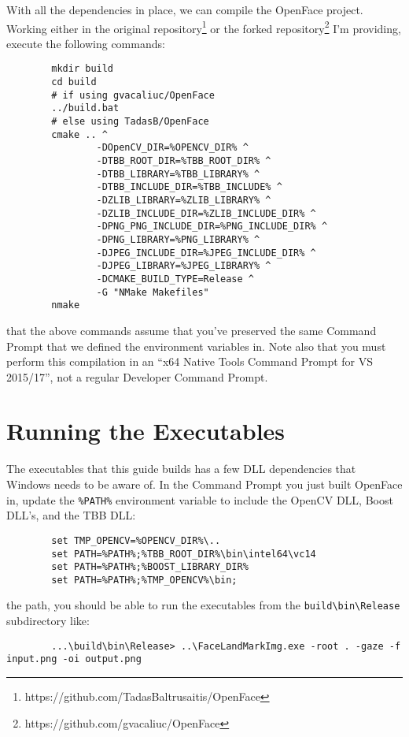 \documentclass{tufte-handout}
\begin{document}
    With all the dependencies in place, we can compile the OpenFace project.  Working
    either in the original repository\footnote{https://github.com/TadasBaltrusaitis/OpenFace} or 
    the forked repository\footnote{https://github.com/gvacaliuc/OpenFace} I'm providing,
    execute the following commands:

    \begin{lstlisting}
        mkdir build
        cd build
        # if using gvacaliuc/OpenFace
        ../build.bat
        # else using TadasB/OpenFace
        cmake .. ^
                -DOpenCV_DIR=%OPENCV_DIR% ^
                -DTBB_ROOT_DIR=%TBB_ROOT_DIR% ^
                -DTBB_LIBRARY=%TBB_LIBRARY% ^
                -DTBB_INCLUDE_DIR=%TBB_INCLUDE% ^
                -DZLIB_LIBRARY=%ZLIB_LIBRARY% ^
                -DZLIB_INCLUDE_DIR=%ZLIB_INCLUDE_DIR% ^
                -DPNG_PNG_INCLUDE_DIR=%PNG_INCLUDE_DIR% ^
                -DPNG_LIBRARY=%PNG_LIBRARY% ^
                -DJPEG_INCLUDE_DIR=%JPEG_INCLUDE_DIR% ^
                -DJPEG_LIBRARY=%JPEG_LIBRARY% ^
                -DCMAKE_BUILD_TYPE=Release ^
                -G "NMake Makefiles"
        nmake
    \end{lstlisting}

     that the above commands assume that you've preserved the same Command
    Prompt that we defined the environment variables in.  Note also that you must perform this
    compilation in an ``x64 Native Tools Command Prompt for VS 2015/17'', not a regular Developer
    Command Prompt.

\section{Running the Executables}

    The executables that this guide builds has a few DLL dependencies that Windows needs to
    be aware of.  In the Command Prompt you just built OpenFace in, update the \Verb|%
    environment variable to include the OpenCV DLL, Boost DLL's, and the TBB DLL:

    \begin{lstlisting}
        set TMP_OPENCV=%OPENCV_DIR%\..
        set PATH=%PATH%;%TBB_ROOT_DIR%\bin\intel64\vc14
        set PATH=%PATH%;%BOOST_LIBRARY_DIR%
        set PATH=%PATH%;%TMP_OPENCV%\bin;
    \end{lstlisting}
   
    \break

     the path, you should be able to run the executables from the 
    \Verb|build\bin\Release| subdirectory like:

    \begin{lstlisting}
        ...\build\bin\Release> ..\FaceLandMarkImg.exe -root . -gaze -f input.png -oi output.png
    \end{lstlisting}
\end{document}
